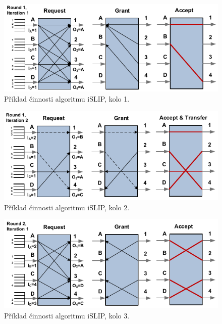 \begin{figure}[H]
    \centering
    \includegraphics[width=1\linewidth]{algoritmus_islip_priklad_1.pdf}
    \caption{Příklad činnosti algoritmu iSLIP, kolo 1.}
\end{figure}

\begin{figure}[H]
    \centering
    \includegraphics[width=1\linewidth]{algoritmus_islip_priklad_2.pdf}
    \caption{Příklad činnosti algoritmu iSLIP, kolo 2.}
\end{figure}

\begin{figure}[H]
    \centering
    \includegraphics[width=1\linewidth]{algoritmus_islip_priklad_3.pdf}
    \caption{Příklad činnosti algoritmu iSLIP, kolo 3.}
\end{figure}


